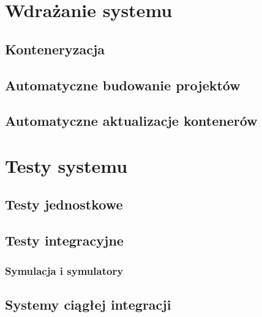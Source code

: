 
\chapter{Wdrażanie systemu}

\section{Konteneryzacja}
\section{Automatyczne budowanie projektów}
\section{Automatyczne aktualizacje kontenerów}


\chapter{Testy systemu}

\section{Testy jednostkowe}
\section{Testy integracyjne}
\subsection{Symulacja i symulatory}
\section{Systemy ciągłej integracji}
